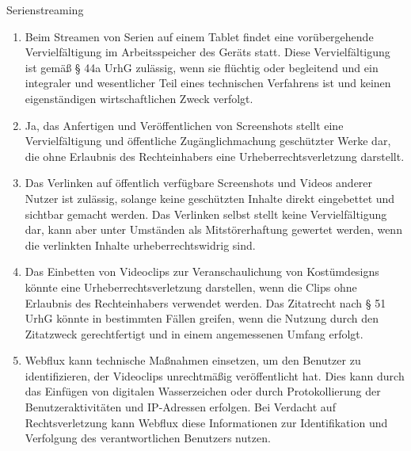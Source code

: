 \documentclass{article}
\begin{document}
\begin{exercise}{Serienstreaming}
  \begin{solution}
    \begin{enumerate}
      \item Beim Streamen von Serien auf einem Tablet findet eine vorübergehende Vervielfältigung im Arbeitsspeicher des Geräts statt. Diese Vervielfältigung ist gemäß § 44a UrhG zulässig, wenn sie flüchtig oder begleitend und ein integraler und wesentlicher Teil eines technischen Verfahrens ist und keinen eigenständigen wirtschaftlichen Zweck verfolgt.
      \item Ja, das Anfertigen und Veröffentlichen von Screenshots stellt eine Vervielfältigung und öffentliche Zugänglichmachung geschützter Werke dar, die ohne Erlaubnis des Rechteinhabers eine Urheberrechtsverletzung darstellt.
      \item Das Verlinken auf öffentlich verfügbare Screenshots und Videos anderer Nutzer ist zulässig, solange keine geschützten Inhalte direkt eingebettet und sichtbar gemacht werden. Das Verlinken selbst stellt keine Vervielfältigung dar, kann aber unter Umständen als Mitstörerhaftung gewertet werden, wenn die verlinkten Inhalte urheberrechtswidrig sind.
      \item Das Einbetten von Videoclips zur Veranschaulichung von Kostümdesigns könnte eine Urheberrechtsverletzung darstellen, wenn die Clips ohne Erlaubnis des Rechteinhabers verwendet werden. Das Zitatrecht nach § 51 UrhG könnte in bestimmten Fällen greifen, wenn die Nutzung durch den Zitatzweck gerechtfertigt und in einem angemessenen Umfang erfolgt.
      \item Webflux kann technische Maßnahmen einsetzen, um den Benutzer zu identifizieren, der Videoclips unrechtmäßig veröffentlicht hat. Dies kann durch das Einfügen von digitalen Wasserzeichen oder durch Protokollierung der Benutzeraktivitäten und IP-Adressen erfolgen. Bei Verdacht auf Rechtsverletzung kann Webflux diese Informationen zur Identifikation und Verfolgung des verantwortlichen Benutzers nutzen.
    \end{enumerate}
  \end{solution}
\end{exercise}
\end{document}
